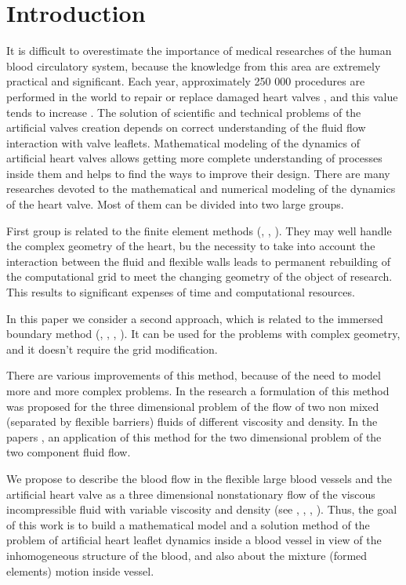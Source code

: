 \documentclass[runningheads,a4paper]{llncs}
\begin{document}
\section{Introduction}
It is difficult to overestimate the importance of medical researches of the human blood circulatory system,
because the knowledge from this area are extremely practical and significant. Each year, approximately 250 000
procedures are performed in the world to repair or replace damaged heart valves \cite{yoganathan}, and this
value tends to increase \cite{yacoub}. The solution of scientific and technical problems of the artificial valves 
creation depends on correct understanding of the fluid flow interaction with valve leaflets. Mathematical modeling
of the dynamics of artificial heart valves allows getting more complete understanding of processes inside them and helps
to find the ways to improve their design. There are many researches devoted to the mathematical and numerical modeling
of the dynamics of the heart valve. Most of them can be divided into two large groups.

First group is related to the finite element methods (\cite{taylor}, \cite{zhang}, \cite{black}). They may well handle
the complex geometry of the heart, bu the necessity to take into account the interaction between the fluid and flexible walls
leads to permanent rebuilding of the computational grid to meet the changing geometry of the object of research.
This results to significant expenses of time and computational resources.

In this paper we consider a second approach, which is related to the immersed boundary method (\cite{pescin_1977},
\cite{boyce_2011}, \cite{ma_x_2013}, \cite{pilhwa_2010}). It can be used for the problems with complex geometry, and it doesn't
require the grid modification.

There are various improvements of this method, because of the need to model more and more complex problems. In the research \cite{fai_2013}
a formulation of this method was proposed for the three dimensional problem of the flow of two non mixed (separated by flexible barriers)
fluids of different viscosity and density. In the papers \cite{jian}, \cite{lee} an application of this method for the two dimensional problem of
the two component fluid flow.

We propose to describe the blood flow in the flexible large blood vessels and the artificial heart valve as a three dimensional
nonstationary flow of the viscous incompressible fluid with variable viscosity and density (see \cite{gummel}, \cite{geidarov},
\cite{milosevic}, \cite{dolgov}). Thus, the goal of this work is to build a mathematical model and a solution method of the problem
of artificial heart leaflet dynamics inside a blood vessel in view of the inhomogeneous structure of the blood, and also about the
mixture (formed elements) motion inside vessel.
\end{document}
